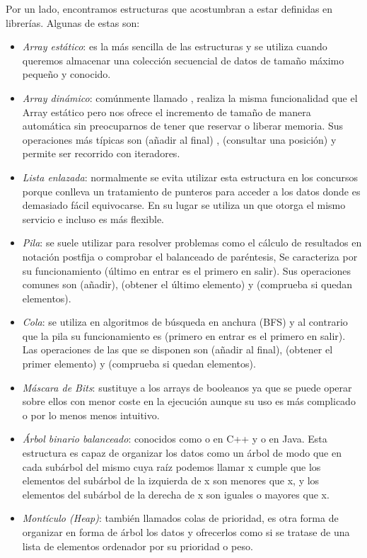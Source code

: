 Por un lado, encontramos estructuras que acostumbran a estar definidas
en librerías. Algunas de estas son:
\begin{itemize}
\item \emph{Array estático}: es la más sencilla de las estructuras y
  se utiliza cuando queremos almacenar una colección secuencial de
  datos de tamaño máximo pequeño y conocido.
\item \emph{Array dinámico}: comúnmente llamado , realiza
  la misma funcionalidad que el Array estático pero nos ofrece el
  incremento de tamaño de manera automática sin preocuparnos de tener
  que reservar o liberar memoria. Sus operaciones más típicas son
   (añadir al final) ,  (consultar una posición) y
  permite ser recorrido con iteradores.
\item \emph{Lista enlazada}: normalmente se evita utilizar esta
  estructura en los concursos porque conlleva un tratamiento de
  punteros para acceder a los datos donde es demasiado fácil
  equivocarse. En su lugar se utiliza un  que otorga el
  mismo servicio e incluso es más flexible.
\item \emph{Pila}: se suele utilizar para resolver problemas como el
  cálculo de resultados en notación postfija o comprobar el balanceado
  de paréntesis, Se caracteriza por su funcionamiento 
  (último en entrar es el primero en salir). Sus operaciones comunes
  son  (añadir),  (obtener el último elemento) y
   (comprueba si quedan elementos).
\item \emph{Cola}: se utiliza en algoritmos de búsqueda en anchura
  (BFS) y al contrario que la pila su funcionamiento es 
  (primero en entrar es el primero en salir). Las operaciones de las
  que se disponen son  (añadir al final),  (obtener
  el primer elemento) y  (comprueba si quedan elementos).
\item \emph{Máscara de Bits}: sustituye a los arrays de booleanos ya
  que se puede operar sobre ellos con menor coste en la ejecución
  aunque su uso es más complicado o por lo menos menos intuitivo.
\item \emph{Árbol binario balanceado}: conocidos como  o
   en C++ y  o  en Java. Esta
  estructura es capaz de organizar los datos como un árbol de modo que
  en cada subárbol del mismo cuya raíz podemos llamar x cumple que los
  elementos del subárbol de la izquierda de x son menores que x, y los
  elementos del subárbol de la derecha de x son iguales o mayores que
  x.
\item \emph{Montículo (Heap)}: también llamados colas de prioridad, es
  otra forma de organizar en forma de árbol los datos y ofrecerlos
  como si se tratase de una lista de elementos ordenador por su
  prioridad o peso.
\end{itemize}

